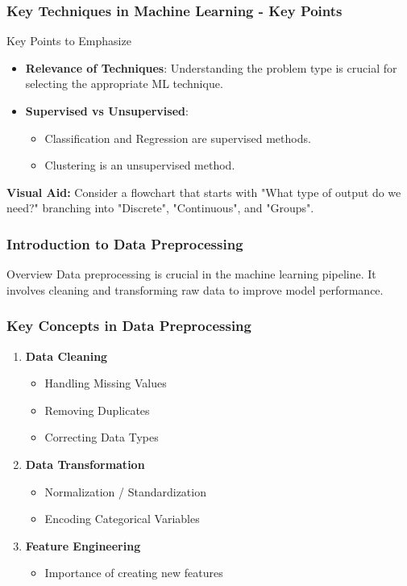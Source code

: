 \documentclass[aspectratio=169]{beamer}
\begin{document}
\begin{frame}[fragile]
    \frametitle{Key Techniques in Machine Learning - Key Points}
    \begin{block}{Key Points to Emphasize}
        \begin{itemize}
            \item \textbf{Relevance of Techniques}: Understanding the problem type is crucial for selecting the appropriate ML technique.
            \item \textbf{Supervised vs Unsupervised}:
            \begin{itemize}
                \item Classification and Regression are supervised methods.
                \item Clustering is an unsupervised method.
            \end{itemize}
        \end{itemize}
        \textbf{Visual Aid:} Consider a flowchart that starts with "What type of output do we need?" branching into "Discrete", "Continuous", and "Groups".
    \end{block}
\end{frame}

\begin{frame}[fragile]
    \frametitle{Introduction to Data Preprocessing}
    \begin{block}{Overview}
        Data preprocessing is crucial in the machine learning pipeline. It involves cleaning and transforming raw data to improve model performance.
    \end{block}
\end{frame}

\begin{frame}[fragile]
    \frametitle{Key Concepts in Data Preprocessing}
    \begin{enumerate}
        \item \textbf{Data Cleaning}
        \begin{itemize}
            \item Handling Missing Values
            \item Removing Duplicates
            \item Correcting Data Types
        \end{itemize}
        \item \textbf{Data Transformation}
        \begin{itemize}
            \item Normalization / Standardization
            \item Encoding Categorical Variables
        \end{itemize}
        \item \textbf{Feature Engineering}
        \begin{itemize}
            \item Importance of creating new features
        \end{itemize}
    \end{enumerate}
\end{frame}
\end{document}

